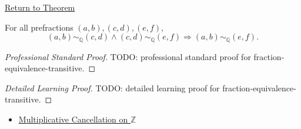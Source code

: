 \newpage
{}
\label{prf:fraction-equivalence-transitive}

\begin{remark*}[Return]
\hyperref[lem:fraction-equivalence-transitive]{Return to Theorem}
\end{remark*}

\begin{lemma*}
For all prefractions $(a,b),(c,d),(e,f)$,
\[
(a,b)\sim_{\mathbb{Q}}(c,d)\land
(c,d)\sim_{\mathbb{Q}}(e,f)
\Longrightarrow
(a,b)\sim_{\mathbb{Q}}(e,f).
\]
\end{lemma*}

\begin{proof}[Professional Standard Proof]
\LRAProofBodyStart
TODO: professional standard proof for fraction-equivalence-transitive.
\end{proof}

\begin{proof}[Detailed Learning Proof]
\LRAProofBodyStart
TODO: detailed learning proof for fraction-equivalence-transitive.
\end{proof}

\begin{remark*}
\end{remark*}

\begin{dependencies}
\begin{itemize}
  \item \hyperref[cor:multiplicative-cancellation-on-z]{Multiplicative Cancellation on $\mathbb{Z}$}
\end{itemize}
\end{dependencies}

\clearpage
